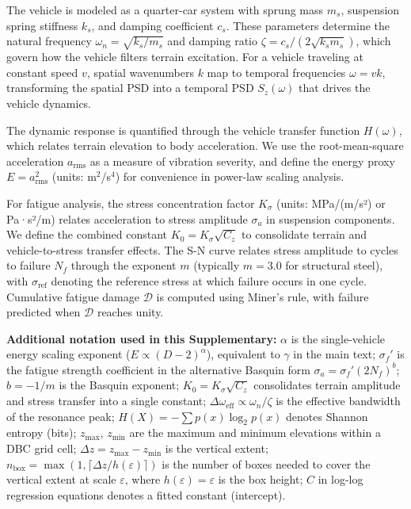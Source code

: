\documentclass[11pt]{article}
\begin{document}
The vehicle is modeled as a quarter-car system with sprung mass $m_s$, suspension spring stiffness $k_s$, and damping coefficient $c_s$. These parameters determine the natural frequency $\omega_n = \sqrt{k_s/m_s}$ and damping ratio $\zeta = c_s/(2\sqrt{k_s m_s})$, which govern how the vehicle filters terrain excitation. For a vehicle traveling at constant speed $v$, spatial wavenumbers $k$ map to temporal frequencies $\omega = vk$, transforming the spatial PSD into a temporal PSD $S_z(\omega)$ that drives the vehicle dynamics.

The dynamic response is quantified through the vehicle transfer function $H(\omega)$, which relates terrain elevation to body acceleration. We use the root-mean-square acceleration $a_{\text{rms}}$ as a measure of vibration severity, and define the energy proxy $E = a_{\text{rms}}^2$ (units: m$^2$/s$^4$) for convenience in power-law scaling analysis.

For fatigue analysis, the stress concentration factor $K_\sigma$ (units: MPa/(m/s²) or Pa·s²/m) relates acceleration to stress amplitude $\sigma_a$ in suspension components. We define the combined constant $K_0 = K_\sigma\sqrt{C_z}$ to consolidate terrain and vehicle-to-stress transfer effects. The S-N curve relates stress amplitude to cycles to failure $N_f$ through the exponent $m$ (typically $m = 3.0$ for structural steel), with $\sigma_{\text{ref}}$ denoting the reference stress at which failure occurs in one cycle. Cumulative fatigue damage $\mathcal{D}$ is computed using Miner's rule, with failure predicted when $\mathcal{D}$ reaches unity.

\textbf{Additional notation used in this Supplementary:} $\alpha$ is the single-vehicle energy scaling exponent ($E \propto (D-2)^\alpha$), equivalent to $\gamma$ in the main text; $\sigma_f'$ is the fatigue strength coefficient in the alternative Basquin form $\sigma_a = \sigma_f'(2N_f)^b$; $b = -1/m$ is the Basquin exponent; $K_0 = K_\sigma\sqrt{C_z}$ consolidates terrain amplitude and stress transfer into a single constant; $\Delta\omega_{\text{eff}} \propto \omega_n/\zeta$ is the effective bandwidth of the resonance peak; $H(X) = -\sum p(x)\log_2 p(x)$ denotes Shannon entropy (bits); $z_{\max}$, $z_{\min}$ are the maximum and minimum elevations within a DBC grid cell; $\Delta z = z_{\max} - z_{\min}$ is the vertical extent; $n_{\text{box}} = \max(1, \lceil \Delta z / h(\varepsilon) \rceil)$ is the number of boxes needed to cover the vertical extent at scale $\varepsilon$, where $h(\varepsilon) = \varepsilon$ is the box height; $C$ in log-log regression equations denotes a fitted constant (intercept).
\end{document}
